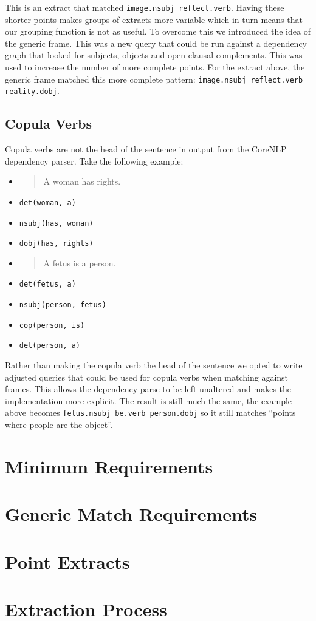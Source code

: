       This is an extract that matched \texttt{image.nsubj reflect.verb}. Having these shorter points makes groups of extracts more variable which in turn means that our grouping function is not as useful. To overcome this we introduced the idea of the generic frame. This was a new query that could be run against a dependency graph that looked for subjects, objects and open clausal complements. This was used to increase the number of more complete points. For the extract above, the generic frame matched this more complete pattern: \texttt{image.nsubj reflect.verb reality.dobj}.

    \subsection{Copula Verbs}
      Copula verbs are not the head of the sentence in output from the CoreNLP dependency parser. Take the following example:
      \begin{multicols}{2}
        \raggedcolumns
        \begin{itemize}[label={}]
          \item{\blockquote{A woman has rights.}}
          \item{\texttt{det(woman, a)}}
          \item{\texttt{nsubj(has, woman)}}
          \item{\texttt{dobj(has, rights)}}
        \end{itemize}
        \columnbreak
        \begin{itemize}[label={}]
          \item{\blockquote{A fetus is a person.}}
          \item{\texttt{det(fetus, a)}}
          \item{\texttt{nsubj(person, fetus)}}
          \item{\texttt{cop(person, is)}}
          \item{\texttt{det(person, a)}}
        \end{itemize}
      \end{multicols}

      Rather than making the copula verb the head of the sentence we opted to write adjusted queries that could be used for copula verbs when matching against frames. This allows the dependency parse to be left unaltered and makes the implementation more explicit. The result is still much the same, the example above becomes \texttt{fetus.nsubj be.verb person.dobj} so it still matches ``points where people are the object''.

  \section{Minimum Requirements}
    \section{Generic Match Requirements}
  \section{Point Extracts}
  \section{Extraction Process}
